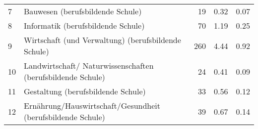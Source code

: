 \begin{longtable}{lXrrr}
     7 &
     \multicolumn{1}{X}{ Bauwesen (berufsbildende Schule)   } &


       \num{19} &
       \num[round-mode=places,round-precision=2]{0.32} &
         \num[round-mode=places,round-precision=2]{0.07} \\

     8 &
     \multicolumn{1}{X}{ Informatik (berufsbildende Schule)   } &


       \num{70} &
       \num[round-mode=places,round-precision=2]{1.19} &
         \num[round-mode=places,round-precision=2]{0.25} \\

     9 &
     \multicolumn{1}{X}{ Wirtschaft (und Verwaltung) (berufsbildende Schule)   } &


       \num{260} &
       \num[round-mode=places,round-precision=2]{4.44} &
         \num[round-mode=places,round-precision=2]{0.92} \\

     10 &
     \multicolumn{1}{X}{ Landwirtschaft/ Naturwissenschaften (berufsbildende Schule)   } &


       \num{24} &
       \num[round-mode=places,round-precision=2]{0.41} &
         \num[round-mode=places,round-precision=2]{0.09} \\

     11 &
     \multicolumn{1}{X}{ Gestaltung (berufsbildende Schule)   } &


       \num{33} &
       \num[round-mode=places,round-precision=2]{0.56} &
         \num[round-mode=places,round-precision=2]{0.12} \\

     12 &
     \multicolumn{1}{X}{ Ernährung/Hauswirtschaft/Gesundheit (berufsbildende Schule)   } &


       \num{39} &
       \num[round-mode=places,round-precision=2]{0.67} &
         \num[round-mode=places,round-precision=2]{0.14} \\


\end{longtable}
